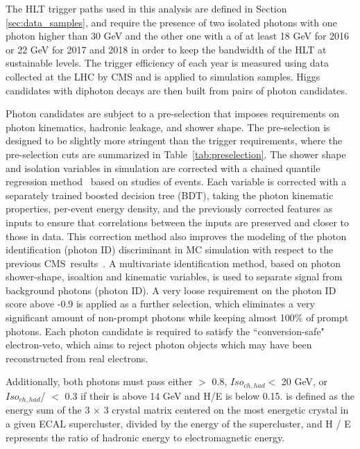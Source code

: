 The HLT trigger paths used in this analysis are defined in Section \ref{sec:data_samples}, and require the presence of two isolated photons with one photon \pt higher than 30 GeV and the other one with a \pt of at least 18 GeV for 2016 or 22 GeV for 2017 and 2018 in order to keep the bandwidth of the HLT at sustainable levels. The trigger efficiency of each year is measured using data collected at the LHC by CMS and is applied to simulation samples. Higgs candidates with diphoton decays are then built from pairs of photon candidates.

Photon candidates are subject to a pre-selection that imposes requirements on photon kinematics, hadronic leakage, and shower shape. The pre-selection is designed to be slightly more stringent than the trigger requirements, where the pre-selection cuts are summarized in Table~\ref{tab:preselection}. 
The shower shape and isolation variables in simulation are corrected with
a chained quantile regression method~\cite{DBLP:journals/corr/abs-1211-6581}
based on studies of \Ztoee events.
Each variable is corrected with a separately trained boosted decision tree (BDT),
taking the photon kinematic properties, per-event energy density, and the previously corrected features as inputs to ensure that correlations between the inputs are preserved and closer to those in data.
This correction method also improves the modeling of the photon identification (photon ID)
discriminant in MC simulation with respect to the previous CMS~\Htogg results~\cite{Sirunyan:2018ouh}.
A multivariate identification method, based on photon shower-shape, isoaltion and kinematic variables, is used to separate \Htogg signal from background photons (photon ID). A very loose requirement on the photon ID score above -0.9 is applied as a further selection, which eliminates a very significant amount of non-prompt photons while keeping almost 100$\%$ of prompt photons.
Each photon candidate is required to satisfy the ``conversion-safe" electron-veto, which aims to reject photon objects which may have been reconstructed from real electrons.

Additionally, both photons must pass either \RNINE$>$ 0.8,
 $Iso_{ch,had}<$ 20 GeV, or $Iso_{ch,had}$/ \pt $<$ 0.3 if their \pt is above 14 GeV and H/E is below 0.15. \RNINE is defined as the energy sum of the 3 × 3 crystal matrix centered on the most energetic
crystal in a given ECAL supercluster, divided by the energy of the supercluster, and H / E represents the ratio of hadronic energy to electromagnetic energy.

